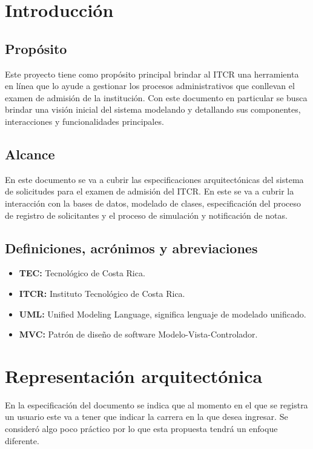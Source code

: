 \documentclass[12pt,a4paper]{article}
\begin{document}
\section{Introducción}

\subsection{Propósito}

Este proyecto tiene como propósito principal brindar al ITCR una herramienta en línea que lo ayude a gestionar los procesos administrativos que conllevan el examen de admisión de la institución. Con este documento en particular se busca brindar una visión inicial del sistema modelando y detallando sus componentes, interacciones y funcionalidades principales.

\subsection{Alcance}

En este documento se va a cubrir las especificaciones arquitectónicas del sistema de solicitudes para el examen de admisión del ITCR. En este se va a cubrir la interacción con la bases de datos, modelado de clases, especificación del proceso de registro de solicitantes y el proceso de simulación y notificación de notas.

\subsection{Definiciones, acrónimos y abreviaciones}

\begin{itemize}
  \item \textbf{TEC:} Tecnológico de Costa Rica.
  \item \textbf{ITCR:} Instituto Tecnológico de Costa Rica.
  \item \textbf{UML:} Unified Modeling Language, significa lenguaje de modelado unificado. \cite{OMG2017}
  \item \textbf{MVC:} Patrón de diseño de software Modelo-Vista-Controlador.
\end{itemize}

\printbibliography
  
\section{Representación arquitectónica}

En la especificación del documento se indica que al momento en el que se registra un usuario este va a tener que indicar la carrera en la que desea ingresar. Se consideró algo poco práctico por lo que esta propuesta tendrá un enfoque diferente.
\end{document}
